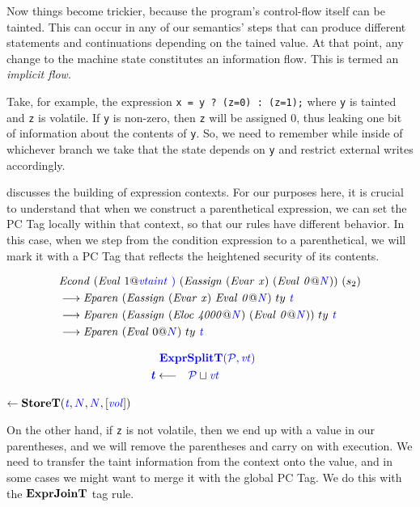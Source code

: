 \documentclass[acmsmall,review,anonymous]{acmart}\settopmatter{printfolios=true,printccs=false,printacmref=false}
\begin{document}
Now things become trickier, because the program's control-flow itself can be tainted.
This can occur in any of our semantics' steps that can produce different statements and continuations
depending on the tained value. At that point, any change to the machine state constitutes
an information flow. This is termed an {\em implicit flow}.

Take, for example, the expression {\tt x = y ? (z=0) : (z=1);} where {\tt y} is
tainted and {\tt z} is volatile. If {\tt y} is non-zero, then {\tt z} will be assigned 0,
thus leaking one bit of information about the contents of {\tt y}. So, we need to remember
while inside of whichever branch we take that the state depends on {\tt y}
and restrict external writes accordingly.

 discusses the building of expression contexts. For our purposes here,
it is crucial to understand that when we construct a parenthetical expression, we can
set the PC Tag locally within that context, so that our rules have different behavior.
In this case, when we step from the condition expression to a parenthetical, we will
mark it with a PC Tag that reflects the heightened security of its contents.

\begin{minipage}[t]{0.59\textwidth}
\[\begin{aligned}
& \mathit{Econd} ~ (\mathit{Eval} ~ 1@\mathit{\color{blue} vtaint ~ )} ~ (\mathit{Eassign ~ (\mathit{Evar} ~ x) ~ (\mathit{Eval} ~ 0@{\color{blue} N})}) ~ (s_2) \\
& \longrightarrow \mathit{Eparen} ~ (\mathit{Eassign ~ (\mathit{Evar} ~ x) ~ \mathit{Eval} ~ 0@{\color{blue} N}}) ~ ty ~ \mathit{\color{blue} t} \\
& \longrightarrow \mathit{Eparen} ~ (\mathit{Eassign ~ (\mathit{Eloc} ~ 4000@{\color{blue} N}) ~ (\mathit{Eval} ~ 0@{\color{blue} N}})) ~ ty ~ \mathit{\color{blue} t} \\
& \longrightarrow \mathit{Eparen} ~ (\mathit{Eval} ~ 0@{\color{blue} N}) ~ ty ~ \mathit{\color{blue} t} \\
\end{aligned}\]
\end{minipage}
\begin{minipage}[t]{0.4\textwidth}
\[\begin{aligned}
\truledef{\exprsplitt}
\settag{\gentag}{\PCT \sqcup \vt}
\end{aligned}\]

 \hspace{-3em} \(\leftarrow \mathbf{StoreT}(\mathit{\color{blue} t}, {\color{blue} N}, {\color{blue} N}, \left[\mathit{\color{blue} vol}\right])\)
\end{minipage}

On the other hand, if {\tt z} is not volatile, then we end up with a value in our
parentheses, and we will remove the parentheses and carry on with execution.
We need to transfer the taint information from the context onto the value, and in
some cases we might want to merge it with the global PC Tag. We do this with
the \(\mathbf{ExprJoinT}\) tag rule.
\end{document}

